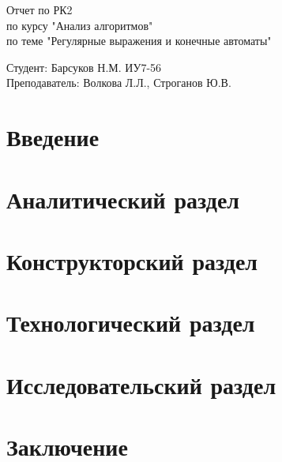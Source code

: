 \documentclass[a4paper, 14pt]{article}
\begin{document}
	\begin{titlepage}
		\begin{center}
			\begin{LARGE}
				Отчет по РК2\\
				по курсу "Анализ алгоритмов"\\
				по теме "Регулярные выражения и конечные автоматы"
			\end{LARGE}
			
			\begin{Large}
				\vspace{10cm}
				Студент: Барсуков Н.М. ИУ7-56\\
				Преподаватель: Волкова Л.Л.,
				Строганов Ю.В.
			\end{Large}
		\end{center}
	\end{titlepage}

	\newpage
	\tableofcontents

	\newpage
	\section*{Введение}
	
	
	\newpage
	\section{Аналитический раздел}
	
	
	\newpage
		\section{Конструкторский раздел}
	
	
	\newpage
	\section{Технологический раздел}
	
	
	\newpage
	\section{Исследовательский раздел}
	
	
	\newpage
	\section{Заключение}
	
	
	\newpage
	\begin{thebibliography}{4}
		
	\end{thebibliography}
	
	
\end{document}
